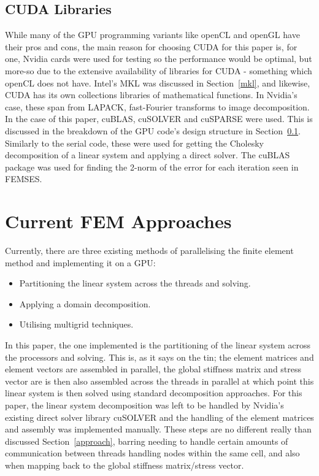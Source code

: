 \subsection{CUDA Libraries}\label{culibs}

While many of the GPU programming variants like openCL and openGL have their pros and cons, the main reason for choosing CUDA for this paper is, for one, Nvidia cards were used for testing so the performance would be optimal, but more-so due to the extensive availability of libraries for CUDA - something which openCL does not have. Intel's MKL was discussed in Section~\ref{mkl}, and likewise, CUDA has its own collections libraries of mathematical functions. In Nvidia's case, these span from LAPACK, fast-Fourier transforms to image decomposition. In the case of this paper, cuBLAS, cuSOLVER and cuSPARSE were used. This is discussed in the breakdown of the GPU code's design structure in Section~\ref{culibs}. Similarly to the serial code, these were used for getting the Cholesky decomposition of a linear system and applying a direct solver. The cuBLAS package was used for finding the 2-norm of the error for each iteration seen in FEMSES.

\section{Current FEM Approaches}\label{approaches}

Currently, there are three existing methods of parallelising the finite element method and implementing it on a GPU:
\begin{itemize}
	\item Partitioning the linear system across the threads and solving.
	\item Applying a domain decomposition.~\cite{liu}
	\item Utilising multigrid techniques.~\cite{liu}
\end{itemize}
In this paper, the one implemented is the partitioning of the linear system across the processors and solving. This is, as it says on the tin; the element matrices and element vectors are assembled in parallel, the global stiffness matrix and stress vector are is then also assembled across the threads in parallel at which point this linear system is then solved using standard decomposition approaches. For this paper, the linear system decomposition was left to be handled by Nvidia's existing direct solver library cuSOLVER and the handling of the element matrices and assembly was implemented manually. These steps are no different really than discussed Section~\ref{approach}, barring needing to handle certain amounts of communication between threads handling nodes within the same cell, and also when mapping back to the global stiffness matrix/stress vector.

